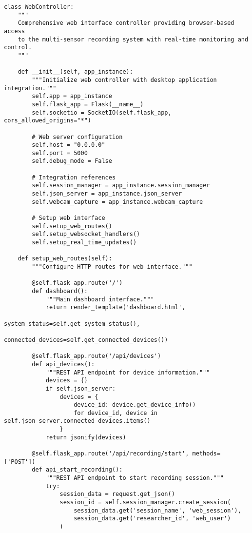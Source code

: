 \documentclass[11pt,a4paper]{article}
\begin{document}
\begin{verbatim}
class WebController:
    """
    Comprehensive web interface controller providing browser-based access
    to the multi-sensor recording system with real-time monitoring and control.
    """

    def __init__(self, app_instance):
        """Initialize web controller with desktop application integration."""
        self.app = app_instance
        self.flask_app = Flask(__name__)
        self.socketio = SocketIO(self.flask_app, cors_allowed_origins="*")

        # Web server configuration
        self.host = "0.0.0.0"
        self.port = 5000
        self.debug_mode = False

        # Integration references
        self.session_manager = app_instance.session_manager
        self.json_server = app_instance.json_server
        self.webcam_capture = app_instance.webcam_capture

        # Setup web interface
        self.setup_web_routes()
        self.setup_websocket_handlers()
        self.setup_real_time_updates()

    def setup_web_routes(self):
        """Configure HTTP routes for web interface."""

        @self.flask_app.route('/')
        def dashboard():
            """Main dashboard interface."""
            return render_template('dashboard.html',
                                   system_status=self.get_system_status(),
                                   connected_devices=self.get_connected_devices())

        @self.flask_app.route('/api/devices')
        def api_devices():
            """REST API endpoint for device information."""
            devices = {}
            if self.json_server:
                devices = {
                    device_id: device.get_device_info()
                    for device_id, device in self.json_server.connected_devices.items()
                }
            return jsonify(devices)

        @self.flask_app.route('/api/recording/start', methods=['POST'])
        def api_start_recording():
            """REST API endpoint to start recording session."""
            try:
                session_data = request.get_json()
                session_id = self.session_manager.create_session(
                    session_data.get('session_name', 'web_session'),
                    session_data.get('researcher_id', 'web_user')
                )


\end{verbatim}
\end{document}
